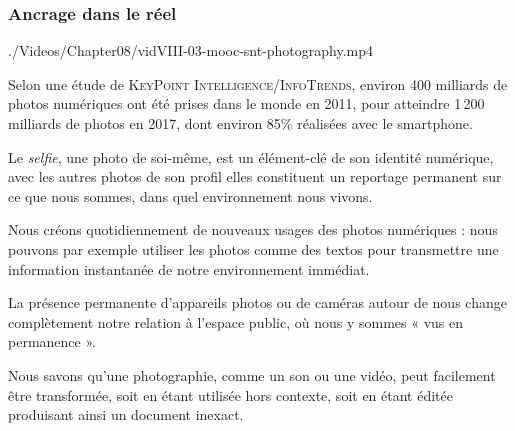 \subsubsection[Ancrage dans le réel]{Ancrage dans le réel}
\label{subsub:VIII.2.1.1}


\begin{marginvideo}
		{./Videos/Chapter08/vidVIII-03-mooc-snt-photography.mp4}%
\end{marginvideo}

\begin{jazzitemize}
\item Selon une étude de \textsc{KeyPoint Intelligence}/\textsc{InfoTrends}, environ 400 milliards de photos numériques ont été prises dans le monde en 2011, pour atteindre 1\,200 milliards de photos en 2017, dont environ 85\% réalisées avec le smartphone.
\item Le \textit{selfie}, une photo de soi-même, est un élément-clé de son identité numérique, avec les autres photos de son profil elles constituent un reportage permanent sur ce que nous sommes, dans quel environnement nous vivons.
\item Nous créons quotidiennement de nouveaux usages des photos numériques : nous pouvons par exemple utiliser les photos comme des textos pour transmettre une information instantanée de notre environnement immédiat.
\item La présence permanente d'appareils photos ou de caméras autour de nous change complètement notre relation à l'espace public, où nous y sommes « vus en permanence ».
\item Nous savons qu'une photographie, comme un son ou une vidéo, peut facilement être transformée, soit en étant utilisée hors contexte, soit en étant éditée produisant ainsi un document inexact.
\end{jazzitemize}

